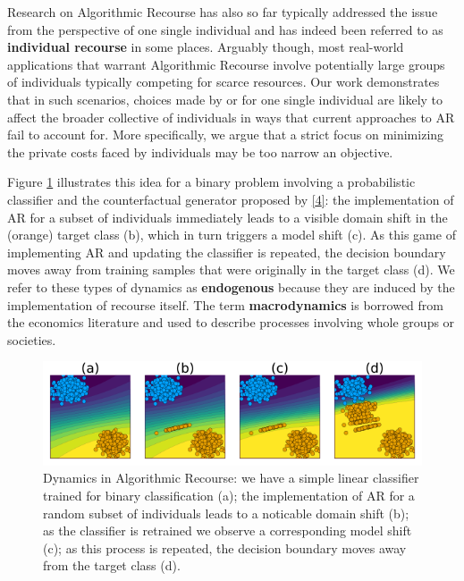 \documentclass[conference,final,]{IEEEtran}
\theoremstyle{definition}
\theoremstyle{definition}
\theoremstyle{definition}
\theoremstyle{definition}
\theoremstyle{remark}
\begin{document}
Research on Algorithmic Recourse has also so far typically addressed the issue from the perspective of one single individual and has indeed been referred to as \textbf{individual recourse} in some places. Arguably though, most real-world applications that warrant Algorithmic Recourse involve potentially large groups of individuals typically competing for scarce resources. Our work demonstrates that in such scenarios, choices made by or for one single individual are likely to affect the broader collective of individuals in ways that current approaches to AR fail to account for. More specifically, we argue that a strict focus on minimizing the private costs faced by individuals may be too narrow an objective.

Figure \ref{fig:poc} illustrates this idea for a binary problem involving a probabilistic classifier and the counterfactual generator proposed by \protect\hyperlink{ref-wachter2017counterfactual}{{[}4{]}}: the implementation of AR for a subset of individuals immediately leads to a visible domain shift in the (orange) target class (b), which in turn triggers a model shift (c). As this game of implementing AR and updating the classifier is repeated, the decision boundary moves away from training samples that were originally in the target class (d). We refer to these types of dynamics as \textbf{endogenous} because they are induced by the implementation of recourse itself. The term \textbf{macrodynamics} is borrowed from the economics literature and used to describe processes involving whole groups or societies.

\begin{figure}

{\centering \includegraphics[width=0.9\linewidth]{www/poc} 

}

\caption{Dynamics in Algorithmic Recourse: we have a simple linear classifier trained for binary classification (a); the implementation of AR for a random subset of individuals leads to a noticable domain shift (b); as the classifier is retrained we observe a corresponding model shift (c); as this process is repeated, the decision boundary moves away from the target class (d).}\label{fig:poc}
\end{figure}
\end{document}
